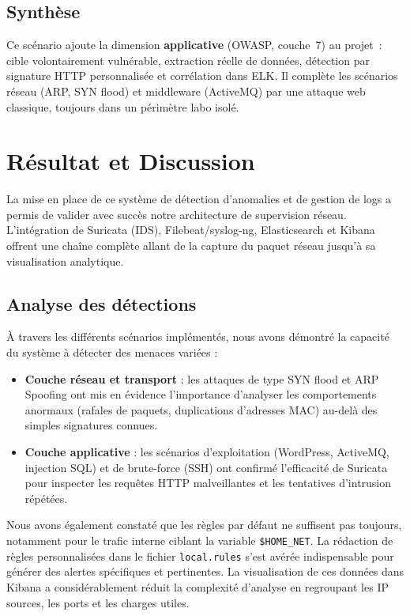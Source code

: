 \documentclass[12pt]{article}
\begin{document}
\subsection{Synthèse}

Ce scénario ajoute la dimension \textbf{applicative} (OWASP, couche~7) au
projet~: cible volontairement vulnérable, extraction réelle de données, détection
par signature HTTP personnalisée et corrélation dans ELK. Il complète les
scénarios réseau (ARP, SYN flood) et middleware (ActiveMQ) par une attaque web
classique, toujours dans un périmètre labo isolé.

\section{Résultat et Discussion}\label{sec:Q8}
La mise en place de ce système de détection d'anomalies et de gestion de logs a permis de valider avec succès notre architecture de supervision réseau. L'intégration de Suricata (IDS), Filebeat/syslog-ng, Elasticsearch et Kibana offrent une chaîne complète allant de la capture du paquet réseau jusqu'à sa visualisation analytique.

\subsection{Analyse des détections}
À travers les différents scénarios implémentés, nous avons démontré la capacité du système à détecter des menaces variées :
\begin{itemize}[nosep]
    \item \textbf{Couche réseau et transport} : les attaques de type SYN flood et ARP Spoofing ont mis en évidence l'importance d'analyser les comportements anormaux (rafales de paquets, duplications d'adresses MAC) au-delà des simples signatures connues.
    \item \textbf{Couche applicative} : les scénarios d'exploitation (WordPress, ActiveMQ, injection SQL) et de brute-force (SSH) ont confirmé l'efficacité de Suricata pour inspecter les requêtes HTTP malveillantes et les tentatives d'intrusion répétées. \\
\end{itemize} 

Nous avons également constaté que les règles par défaut ne suffisent pas toujours, notamment pour le trafic interne ciblant la variable \texttt{\$HOME\_NET}. La rédaction de règles personnalisées dans le fichier \texttt{local.rules} s'est avérée indispensable pour générer des alertes spécifiques et pertinentes. La visualisation de ces données dans Kibana a considérablement réduit la complexité d'analyse en regroupant les IP sources, les ports et les charges utiles.
\end{document}
